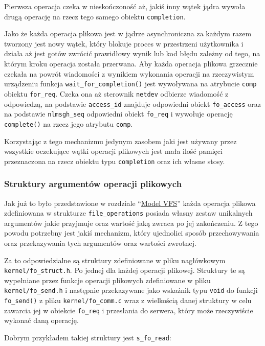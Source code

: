 Pierwsza operacja czeka w nieskończoność aż, jakiś inny wątek jądra
wywoła drugą operację na rzecz tego samego obiektu \texttt{completion}.

Jako że każda operacja plikowa jest w jądrze asynchroniczna za każdym
razem tworzony jest nowy wątek, który blokuje proces w przestrzeni
użytkownika i działa aż jest gotów zwrócić prawidłowy wynik lub kod
błędu zależny od tego, na którym kroku operacja została przerwana. Aby
każda operacja plikowa grzecznie czekała na powrót wiadomości z wynikiem
wykonania operacji na rzeczywistym urządzeniu funkcja
\texttt{wait\_for\_completion()} jest wywoływana na atrybucie
\texttt{comp} obiektu \texttt{for\_req}. Czeka ona aż sterownik
\texttt{netdev} odbierze wiadomość z odpowiedzą, na podstawie
\texttt{access\_id} znajduje odpowiedni obiekt \texttt{fo\_access} oraz
na podstawie \texttt{nlmsgh\_seq} odpowiedni obiekt \texttt{fo\_req} i
wywołuje operację \texttt{complete()} na rzecz jego atrybutu
\texttt{comp}.

Korzystając z tego mechanizmu jedynym zasobem jaki jest używany przez
wszystkie oczekujące wątki operacji plikowych jest mała ilość pamięci
przeznaczona na rzecz obiektu typu \texttt{completion} oraz ich własne
stosy.

\subsubsection{Struktury argumentów operacji plikowych}

Jak już to było przedstawione w rozdziale ``\hyperref[model-vfs]{Model
VFS}'' każda operacja plikowa zdefiniowana w strukturze
\texttt{file\_operations} posiada własny zestaw unikalnych argumentów
jakie przyjmuje oraz wartość jaką zwraca po jej zakończeniu. Z tego
powodu potrzebny jest jakiś mechanizm, który ujednolici sposób
przechowywania oraz przekazywania tych argumentów oraz wartości
zwrotnej.

Za to odpowiedzialne są struktury zdefiniowane w pliku nagłówkowym
\texttt{kernel/fo\_struct.h}. Po jednej dla każdej operacji plikowej.
Struktury te są wypełniane przez funkcje operacji plikowych zdefiniowane
w pliku \texttt{kernel/fo\_send.h} i następnie przekazywane jako
wskaźnik typu \texttt{void} do funkcji \texttt{fo\_send()} z pliku
\texttt{kernel/fo\_comm.c} wraz z wielkością danej struktury w celu
zawarcia jej w obiekcie \texttt{fo\_req} i przesłania do serwera, który
może rzeczywiście wykonać daną operację.

Dobrym przykładem takiej struktury jest \texttt{s\_fo\_read}:

